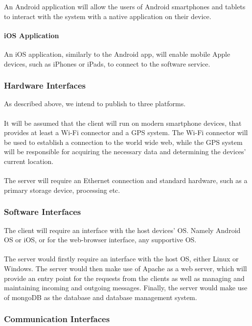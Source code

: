 \documentclass[12pt,a4paper]{article}
\begin{document}
					An Android application will allow the users of Android smartphones
					and tablets to interact with the system with a native application on
					their device.

				\paragraph{iOS Application}

					An iOS application, similarly to the Android app, will enable mobile
					Apple devices, such as iPhones or iPads, to connect to the software
					service.

			\subsubsection{Hardware Interfaces}

				As described above, we intend to publish to three platforms.\\\\
				It will be assumed that the client will run on modern smartphone devices, 
				that provides at least a Wi-Fi connector and a GPS system. The Wi-Fi 
				connector will be used to establish a connection to the world wide web, 
				while the GPS system will be responsible for acquiring the necessary data 
				and determining the devices' current location.\\\\
				The server will require an Ethernet connection and standard hardware, such 
				as a primary storage device, processing etc.


			\subsubsection{Software Interfaces}

				The client will require an interface with the host devices' OS. Namely Android OS or iOS, 
				or for the web-browser interface, any supportive OS.\\\\
				The server would firstly require an interface with the host OS, either Linux or Windows. 
				The server would then make use of Apache as a web server, which will provide an entry point 
				for the requests from the clients as well as managing and maintaining incoming and outgoing 
				messages. Finally, the server would make use of mongoDB as the database and database 
				management system. 

			\subsubsection{Communication Interfaces}
			
\end{document}
